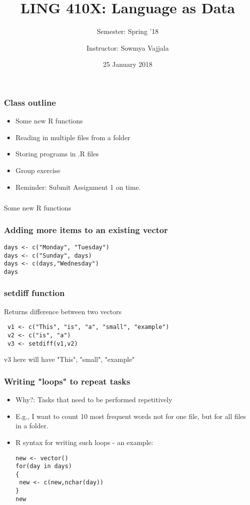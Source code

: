 \documentclass{beamer}
\author[Sowmya Vajjala]{Instructor: Sowmya Vajjala}
\title[LING 410X]{LING 410X: Language as Data}
\subtitle{Semester: Spring '18}
\date{25 January 2018}
\institute{Iowa State University, USA}
\begin{document}
\begin{frame}\titlepage
\end{frame}

\begin{frame}
\frametitle{Class outline}
\begin{itemize}
\item Some new R functions
\item Reading in multiple files from a folder
\item Storing programs in .R files
\item Group exercise
\item Reminder: Submit Assignment 1 on time.
\end{itemize}
\end{frame}

\begin{frame}
\frametitle{}
\Large Some new R functions
\end{frame}

\begin{frame}[fragile]
\frametitle{Adding more items to an existing vector}
\begin{verbatim}
days <- c("Monday", "Tuesday")
days <- c("Sunday", days)
days <- c(days,"Wednesday")
days
\end{verbatim}
\end{frame}

\begin{frame}[fragile]
\frametitle{setdiff function}
Returns difference between two vectors
\scriptsize
\begin{verbatim}
 v1 <- c("This", "is", "a", "small", "example")
 v2 <- c("is", "a")
 v3 <- setdiff(v1,v2)
\end{verbatim}
\small
v3 here will have "This", "small", "example"
\end{frame}

\begin{frame}[fragile]
\frametitle{Writing "loops" to repeat tasks}
\begin{itemize}
\item Why?: Tasks that need to be performed repetitively
\item E.g., I want to count 10 most frequent words not for one file, but for all files in a folder. \pause
\item R syntax for writing such loops - an example:
\begin{verbatim}
new <- vector()
for(day in days)
{
 new <- c(new,nchar(day))
}
new
\end{verbatim}
\end{itemize}
\end{frame}
\end{document}
